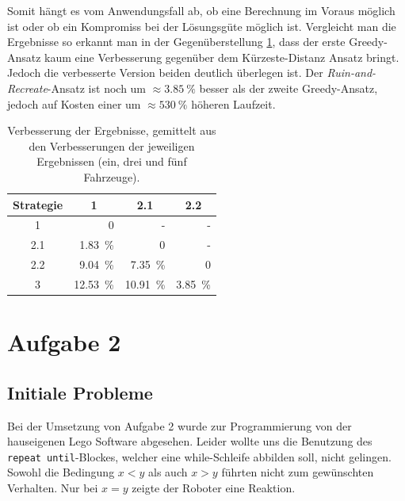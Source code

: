 \documentclass[ngerman]{tudscrreprt}
\newcommand{\code}[1]{\texttt{#1}}
\begin{document}
Somit hängt es vom Anwendungsfall ab, ob eine Berechnung im Voraus möglich ist oder
ob ein Kompromiss bei der Lösungsgüte möglich ist.
Vergleicht man die Ergebnisse so erkannt man in der Gegenüberstellung \ref{table:compare-strategies},
dass der erste Greedy-Ansatz kaum eine Verbesserung gegenüber dem Kürzeste-Distanz Ansatz bringt.
Jedoch die verbesserte Version beiden deutlich überlegen ist.
Der \emph{Ruin-and-Recreate}-Ansatz ist noch um $\approx \SI{3.85}{\percent}$ besser als der
zweite Greedy-Ansatz, jedoch auf Kosten einer um $\approx \SI{530}{\percent}$ höheren Laufzeit.

\begin{table}[H]
    \centering
    \begin{tabular}{|c|r|r|r|}
    \hline\centering
    Strategie & \multicolumn{1}{c|}{1} & \multicolumn{1}{c|}{2.1} & \multicolumn{1}{c|}{2.2}
                                                                                        \\ \hline
    1         & 0                      & -                        & -                   \\ \hline
    2.1       & \SI{ 1.83}{\percent}   & 0                        & -                   \\ \hline
    2.2       & \SI{ 9.04}{\percent}   & \SI{ 7.35}{\percent}     & 0                   \\ \hline
    3         & \SI{12.53}{\percent}   & \SI{10.91}{\percent}     & \SI{3.85}{\percent} \\ \hline
    \end{tabular}
    \caption{Verbesserung der Ergebnisse, gemittelt aus den Verbesserungen der jeweiligen Ergebnissen (ein, drei und fünf Fahrzeuge).}
    \label{table:compare-strategies}
\end{table}

\chapter{Aufgabe 2}
\section{Initiale Probleme}
Bei der Umsetzung von Aufgabe 2 wurde zur Programmierung von der hauseigenen Lego Software abgesehen. Leider wollte uns die Benutzung des \code{repeat until}-Blockes, welcher eine while-Schleife abbilden soll, nicht gelingen. Sowohl die Bedingung $x < y$ als auch $x > y$ führten nicht zum gewünschten Verhalten. Nur bei $x = y$ zeigte der Roboter eine Reaktion.
\end{document}
